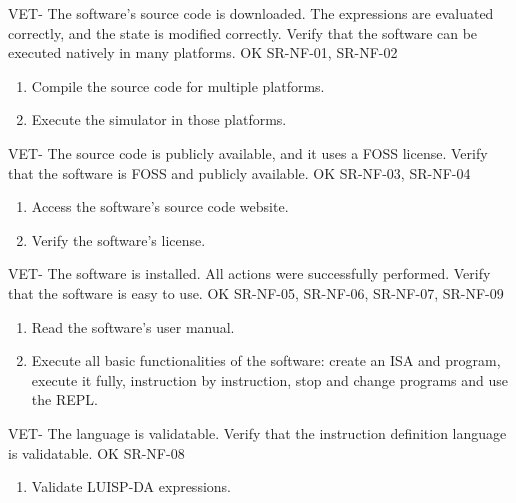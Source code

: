 \begin{testCase}{VET-}
  {The software's source code is downloaded.}  %
  {The expressions are evaluated correctly, and the state is modified correctly.}  %
  {Verify that the software can be executed natively in many platforms.}  %
  {OK}  %
  {SR-NF-01, SR-NF-02}  %
  \begin{enumerate}[leftmargin=*, topsep=0pt, noitemsep]  %
    \item Compile the source code for multiple platforms.
    \item Execute the simulator in those platforms.
  \end{enumerate}
\end{testCase}

\begin{testCase}{VET-}
  {\NA}  %
  {The source code is publicly available, and it uses a \gls{FOSS} license.}  %
  {Verify that the software is \gls{FOSS} and publicly available.}  %
  {OK}  %
  {SR-NF-03, SR-NF-04}  %
  \begin{enumerate}[leftmargin=*, topsep=0pt, noitemsep]  %
    \item Access the software's source code website.
    \item Verify the software's license.
  \end{enumerate}
\end{testCase}

\begin{testCase}{VET-}
  {The software is installed.}  %
  {All actions were successfully performed.}  %
  {Verify that the software is easy to use.}  %
  {OK}  %
  {SR-NF-05, SR-NF-06, SR-NF-07, SR-NF-09}  %
  \begin{enumerate}[leftmargin=*, topsep=0pt, noitemsep]  %
    \item Read the software's user manual.
    \item Execute all basic functionalities of the software: create an \gls{ISA} and program, execute it fully, instruction by instruction, stop and change programs and use the REPL.
  \end{enumerate}
\end{testCase}

\begin{testCase}{VET-}
  {\NA}  %
  {The language is validatable.}  %
  {Verify that the instruction definition language is validatable.}  %
  {OK}  %
  {SR-NF-08}  %
  \begin{enumerate}[leftmargin=*, topsep=0pt, noitemsep]  %
    \item Validate LUISP-DA expressions.
  \end{enumerate}
\end{testCase}

